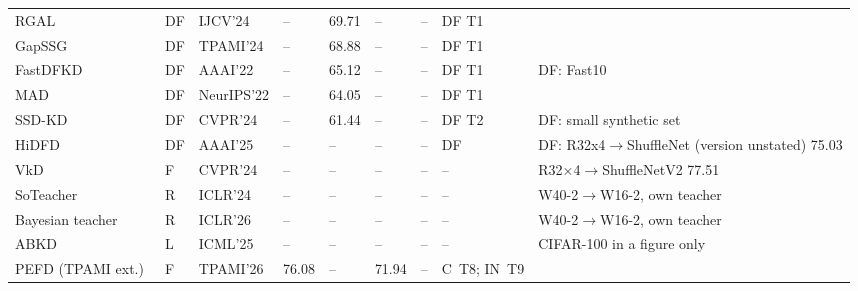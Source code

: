 {\begin{longtable}{@{}lllllll>{\raggedright\arraybackslash}p{1.5cm}>{\raggedright\arraybackslash}p{3.8cm}@{}}
RGAL~\citep{liang2024rgal} & DF & IJCV'24 & -- & 69.71 & -- & -- & DF T1 &  \\
GapSSG~\citep{wang2024gapssg} & DF & TPAMI'24 & -- & 68.88 & -- & -- & DF T1 &  \\
FastDFKD~\citep{fang2022fastdfkd} & DF & AAAI'22 & -- & 65.12 & -- & -- & DF T1 & DF: Fast10 \\
MAD~\citep{do2022mad} & DF & NeurIPS'22 & -- & 64.05 & -- & -- & DF T1 &  \\
SSD-KD~\citep{liu2024ssdkd} & DF & CVPR'24 & -- & 61.44 & -- & -- & DF T2 & DF: small synthetic set \\
HiDFD~\citep{tang2025hidfd} & DF & AAAI'25 & -- & -- & -- & -- & DF & DF: R32x4$\to$ShuffleNet (version unstated) 75.03 \\
VkD~\citep{miles2024vkd} & F & CVPR'24 & -- & -- & -- & -- & -- & R32$\times$4$\to$ShuffleNetV2 77.51 \\
SoTeacher~\citep{dong2024soteacher} & R & ICLR'24 & -- & -- & -- & -- & -- & W40-2$\to$W16-2, own teacher \\
Bayesian teacher~\citep{morad2026bayesteacher} & R & ICLR'26 & -- & -- & -- & -- & -- & W40-2$\to$W16-2, own teacher \\
ABKD~\citep{wang2025abkd} & L & ICML'25 & -- & -- & -- & -- & -- & CIFAR-100 in a figure only \\
PEFD (TPAMI ext.)~\citep{chen2026pefd} & F & TPAMI'26 & 76.08 & -- & 71.94 & -- & C~T8; IN~T9 &  \\
\end{longtable}}
